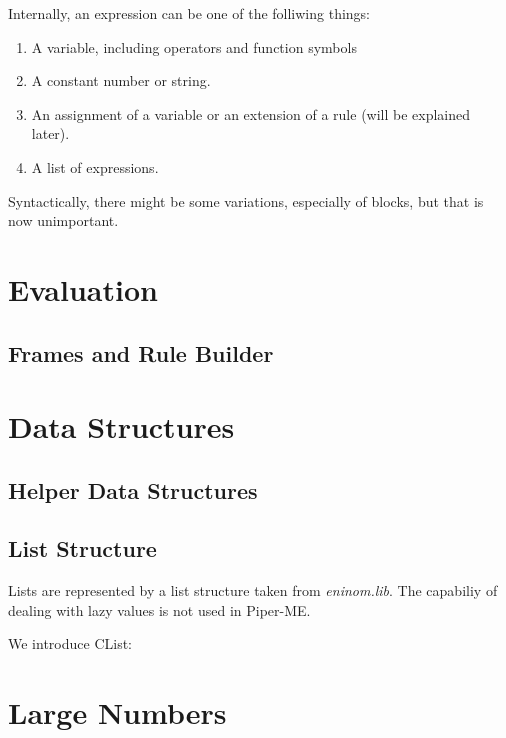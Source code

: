 Internally, an expression can be one of the folliwing things:

\begin{enumerate}
\item A variable, including operators and function symbols
\item A constant number or string.
\item An assignment of a variable or an extension of a rule (will be explained later).
\item A list of expressions.
\end{enumerate}

Syntactically, there might be some variations, especially of blocks, but that is 
now unimportant. 




\chapter{Evaluation}

\section{Frames and Rule Builder}




\chapter{Data Structures}

\section{Helper Data Structures}


\section{List Structure}

Lists are represented by a list structure taken from {\em eninom.lib}. The capabiliy
of dealing with lazy values is not used in Piper-ME.

We introduce CList:
 


\chapter{Large Numbers}





